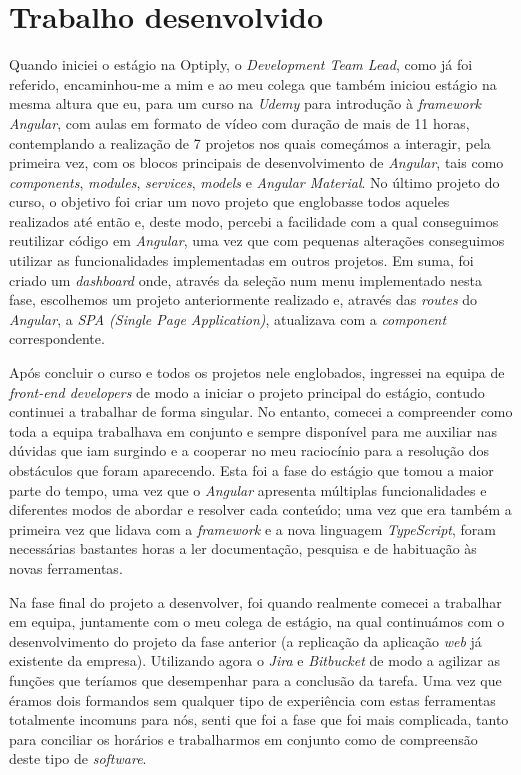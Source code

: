 \documentclass{article}
\begin{document}
\section{Trabalho desenvolvido}
\label{sec:trab-dev}
\hspace*{0.5cm} Quando iniciei o estágio na Optiply, o \emph{Development Team Lead}, como já foi referido, encaminhou-me a mim e ao meu colega que também iniciou estágio na mesma altura que eu, para um curso na \emph{Udemy} para introdução à \emph{framework Angular}, com aulas em formato de vídeo com duração de mais de 11 horas, contemplando a realização de 7 projetos nos quais começámos a interagir, pela primeira vez, com os blocos principais de desenvolvimento de \emph{Angular}, tais como \emph{components}, \emph{modules}, \emph{services}, \emph{models} e \emph{Angular Material}. No último projeto do curso, o objetivo foi criar um novo projeto que englobasse todos aqueles realizados até então e, deste modo, percebi a facilidade com a qual conseguimos reutilizar código em \emph{Angular}, uma vez que com pequenas alterações conseguimos utilizar as funcionalidades implementadas em outros projetos. Em suma, foi criado um \emph{dashboard} onde, através da seleção num menu implementado nesta fase, escolhemos um projeto anteriormente realizado e, através das \emph{routes} do \emph{Angular}, a \emph{SPA (Single Page Application)}, atualizava com a \emph{component} correspondente. \newline

\hspace*{0.5cm} Após concluir o curso e todos os projetos nele englobados, ingressei na equipa de \emph{front-end developers} de modo a iniciar o projeto principal do estágio, contudo continuei a trabalhar de forma singular. No entanto, comecei a compreender como toda a equipa trabalhava em conjunto e sempre disponível para me auxiliar nas dúvidas que iam surgindo e a cooperar no meu raciocínio para a resolução dos obstáculos que foram aparecendo. Esta foi a fase do estágio que tomou a maior parte do tempo, uma vez que o \emph{Angular} apresenta múltiplas funcionalidades e diferentes modos de abordar e resolver cada conteúdo; uma vez que era também a primeira vez que lidava com a \emph{framework} e a nova linguagem \emph{TypeScript}, foram necessárias bastantes horas a ler documentação, pesquisa e de habituação às novas ferramentas. \newline

\hspace*{0.5cm} Na fase final do projeto a desenvolver, foi quando realmente comecei a trabalhar em equipa, juntamente com o meu colega de estágio, na qual continuámos com o desenvolvimento do projeto da fase anterior (a replicação da aplicação \emph{web} já existente da empresa). Utilizando agora o \emph{Jira} e \emph{Bitbucket} de modo a agilizar as funções que teríamos que desempenhar para a conclusão da tarefa. Uma vez que éramos dois formandos sem qualquer tipo de experiência com estas ferramentas totalmente incomuns para nós, senti que foi a fase que foi mais complicada, tanto para conciliar os horários e trabalharmos em conjunto como de compreensão deste tipo de \emph{software}. \newline
\end{document}

